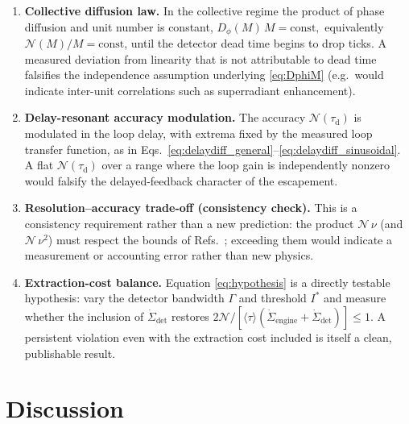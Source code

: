 \documentclass[aps,pre,reprint,amsmath,amssymb,floatfix,nofootinbib]{revtex4-2}
\newcommand{\avg}[1]{\langle #1 \rangle}
\newcommand{\Sdot}{\dot{\Sigma}}
\newcommand{\Dphi}{D_{\phi}}
\newcommand{\taud}{\tau_{\mathrm{d}}}
\begin{document}
\begin{enumerate}
\item \textbf{Collective diffusion law.}
In the collective regime the product of phase diffusion and unit number
is constant,
\(
  \Dphi(M)\,M = \mathrm{const},
\)
equivalently $\mathcal{N}(M)/M=\mathrm{const}$, until the detector dead
time begins to drop ticks. A measured deviation from linearity that is
not attributable to dead time falsifies the independence assumption
underlying \eqref{eq:DphiM} (e.g.\ would indicate inter-unit
correlations such as superradiant enhancement).

\item \textbf{Delay-resonant accuracy modulation.}
The accuracy $\mathcal{N}(\taud)$ is modulated in the loop
delay, with extrema fixed by the measured loop transfer function, as in
Eqs.~\eqref{eq:delaydiff_general}--\eqref{eq:delaydiff_sinusoidal}. A flat $\mathcal{N}(\taud)$ over a range where the loop gain is independently nonzero would falsify the
delayed-feedback character of the escapement.

\item \textbf{Resolution--accuracy trade-off (consistency check).}
This is a consistency requirement rather than a new prediction: the
product $\mathcal{N}\,\nu$ (and $\mathcal{N}\,\nu^2$) must respect the
bounds of Refs.~\cite{Meier2023,Prech2025}; exceeding them would indicate
a measurement or accounting error rather than new physics.

\item \textbf{Extraction-cost balance.}
Equation \eqref{eq:hypothesis} is a directly testable hypothesis: vary
the detector bandwidth $\Gamma$ and threshold $I^\ast$ and measure
whether the inclusion of $\Sdot_{\mathrm{det}}$ restores
$2\mathcal{N}/[\avg{\tau}(\Sdot_{\mathrm{engine}}+\Sdot_{\mathrm{det}})]\le1$.
A persistent violation even with the extraction cost included is itself a
clean, publishable result.
\end{enumerate}

\section{Discussion}
\label{sec:discussion}
\end{document}
